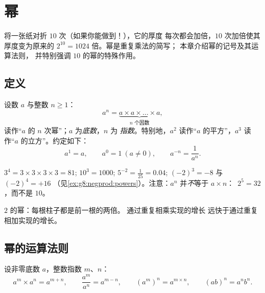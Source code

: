 \chapter{幂}\label{ch:g8:powers}

将一张纸对折 $10$ 次（如果你能做到！），它的厚度
每次都会加倍，$10$ 次加倍使其厚度变为原来的
$2^{10} = 1024$ 倍。幂是重复乘法的简写；
本章介绍幂的记号及其运算法则，
并特别强调 $10$ 的幂的特殊作用。

\section{定义}

\begin{definition}[幂]\label{def:g8:powers:def}
设数 $a$ 与整数 $n \geq 1$：
\[
a^n = \underbrace{a \times a \times \dots \times a}_{n
\text{ 个因数}},
\]
读作“$a$ 的 $n$ 次幂”；$a$ 为\emph{底数}，$n$ 为
\emph{指数}。特别地，$a^2$ 读作“$a$
的平方”，$a^3$ 读作“$a$ 的立方”。约定如下：
\[
a^1 = a,
\qquad
a^0 = 1 \ (a \neq 0),
\qquad
a^{-n} = \frac{1}{a^n}.
\]
\end{definition}

\begin{example}\label{ex:g8:powers:def}
$3^4 = 3 \times 3 \times 3 \times 3 = 81$; \quad
$10^3 = 1000$; \quad $5^{-2} = \frac{1}{25} = 0.04$; \quad
$(-2)^3 = -8$ 与 $(-2)^4 = +16$
（见\cref{ex:g8:negprod:powers}）。注意：$a^n$ 并\emph{不}等于
$a \times n$：\ $2^5 = 32$，而不是 $10$。
\end{example}

\begin{omfigure}

{\small $2$ 的幂：每根柱子都是前一根的两倍。
通过重复相乘实现的增长
远快于通过重复相加实现的增长。}
\end{omfigure}

\section{幂的运算法则}

\begin{theorem}[幂的运算法则]\label{thm:g8:powers:rules}
设非零底数 $a$，整数指数 $m$、$n$：
\[
a^m \times a^n = a^{m+n},
\qquad
\frac{a^m}{a^n} = a^{m-n},
\qquad
\left(a^m\right)^n = a^{m \times n},
\qquad
(ab)^n = a^n b^n .
\]
\end{theorem}

